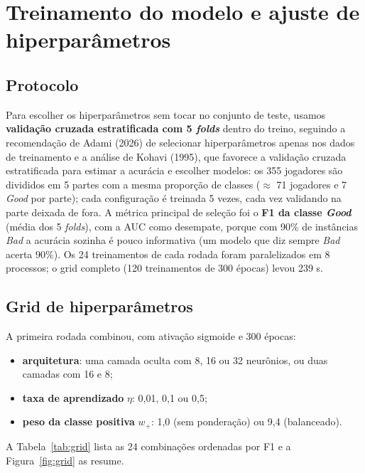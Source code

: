 \documentclass[11pt,a4paper]{article}
\begin{document}
\section{Treinamento do modelo e ajuste de hiperparâmetros}\label{sec:treino}

\subsection{Protocolo}
Para escolher os hiperparâmetros sem tocar no conjunto de teste, usamos \textbf{validação cruzada
estratificada com 5 \emph{folds}} dentro do treino, seguindo a recomendação de Adami (2026) de selecionar
hiperparâmetros apenas nos dados de treinamento e a análise de Kohavi (1995), que favorece a validação
cruzada estratificada para estimar a acurácia e escolher modelos: os 355 jogadores são divididos em 5 partes com a mesma
proporção de classes ($\approx$ 71 jogadores e 7 \emph{Good} por parte); cada configuração é treinada 5 vezes,
cada vez validando na parte deixada de fora. A métrica principal de seleção foi o \textbf{F1 da classe
\emph{Good}} (média dos 5 \emph{folds}), com a AUC como desempate, porque com 90\% de instâncias \emph{Bad} a
acurácia sozinha é pouco informativa (um modelo que diz sempre \emph{Bad} acerta 90\%). Os 24 treinamentos
de cada rodada foram paralelizados em 8 processos; o grid completo (120 treinamentos de 300 épocas) levou
239 s.

\subsection{Grid de hiperparâmetros}\label{sec:grid}
A primeira rodada combinou, com ativação sigmoide e 300 épocas:
\begin{itemize}
  \item \textbf{arquitetura}: uma camada oculta com 8, 16 ou 32 neurônios, ou duas camadas com 16 e 8;
  \item \textbf{taxa de aprendizado} $\eta$: 0,01, 0,1 ou 0,5;
  \item \textbf{peso da classe positiva} $w_+$: 1,0 (sem ponderação) ou 9,4 (balanceado).
\end{itemize}
A Tabela~\ref{tab:grid} lista as 24 combinações ordenadas por F1 e a Figura~\ref{fig:grid} as resume.

\begin{table}[H]\centering\footnotesize

\caption{Validação cruzada (5 \emph{folds}, 300 épocas, sigmoide): média das métricas de validação para cada combinação; F1 com desvio padrão entre \emph{folds}. A melhor configuração está em negrito.}\label{tab:grid}
\end{table}
\end{document}
